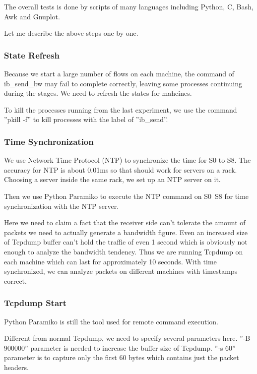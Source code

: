 \documentclass[12pt,a4paper]{article}
\begin{document}
The overall tests is done by scripts of many languages including Python, C, Bash, Awk and Gnuplot.

Let me describe the above steps one by one.

\subsubsection{State Refresh}

Because we start a large number of flows on each machine, the command of ib\_send\_bw may fail to complete correctly, leaving
some processes continuing during the stages. We need to refresh the states for mahcines.

To kill the processes running from the last experiment, we use the command ''pkill -f'' to kill processes with the label of ''ib\_send''.

\subsubsection{Time Synchronization}
We use Network Time Protocol (NTP) to synchronize the time for S0 to S8.
The accuracy for NTP is about 0.01ms so that should work for servers on a rack.
Choosing a server inside the same rack, we set up an NTP server on it.

Then we use Python Paramiko to execute the NTP command on S0~S8 for time synchronization with the NTP server.

Here we need to claim a fact that the receiver side can't tolerate the amount of packets we need to actually generate a bandwidth figure.
Even an increased size of Tcpdump buffer can't hold the traffic of even 1 second which is obviously not enough to analyze the bandwidth tendency.
Thus we are running Tcpdump on each machine which can last for approximately 10 seconds.
With time synchronized, we can analyze packets on different machines with timestamps correct.

\subsubsection{Tcpdump Start}
Python Paramiko is still the tool used for remote command execution.

Different from normal Tcpdump, we need to specify several parameters here.
''-B 900000'' parameter is needed to increase the buffer size of Tcpdump.
''-s 60'' parameter is to capture only the first 60 bytes which contains just the packet headers.
\end{document}
